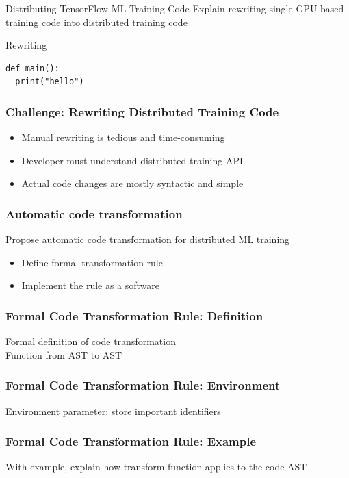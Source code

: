 \documentclass{beamer}
\begin{document}
\begin{frame}{Distributing TensorFlow ML Training Code}
  Explain rewriting single-GPU based training code 
  into distributed training code
\end{frame}


\begin{frame}[fragile]{Rewriting}
\begin{verbatim}
def main():
  print("hello") 
\end{verbatim}
\end{frame}


\begin{frame}
  \frametitle{Challenge: Rewriting Distributed Training Code}
  \begin{itemize}
    \item Manual rewriting is tedious and time-consuming
    \item Developer must understand distributed training API
    \item Actual code changes are mostly syntactic and simple
  \end{itemize}
\end{frame}


\begin{frame}
  \frametitle{Automatic code transformation}
  Propose automatic code transformation for distributed ML training
  \begin{itemize}
    \item Define formal transformation rule
    \item Implement the rule as a software
  \end{itemize}
\end{frame}


\begin{frame}
  \frametitle{Formal Code Transformation Rule: Definition}
  Formal definition of code transformation\\
  Function from AST to AST  
\end{frame}


\begin{frame}
  \frametitle{Formal Code Transformation Rule: Environment}
  Environment parameter: store important identifiers
\end{frame}


\begin{frame}
  \frametitle{Formal Code Transformation Rule: Example}
  With example, explain how transform function applies to the code AST
\end{frame}
\end{document}

